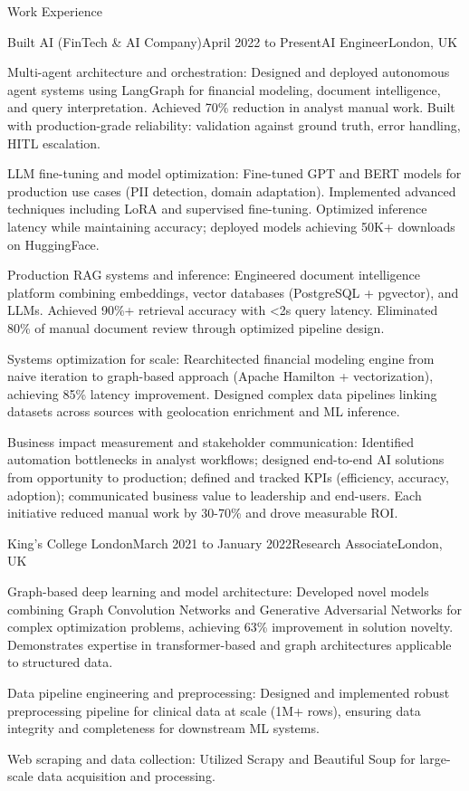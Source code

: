 \documentclass{resume} %
\begin{document}
\begin{rSection}{Work Experience}
\begin{rSubsection}{Built AI (FinTech \& AI Company)}{April 2022 to Present}{AI Engineer}{London, UK}
\item Multi-agent architecture and orchestration: Designed and deployed autonomous agent systems using LangGraph for financial modeling, document intelligence, and query interpretation. Achieved 70\% reduction in analyst manual work. Built with production-grade reliability: validation against ground truth, error handling, HITL escalation.
\item LLM fine-tuning and model optimization: Fine-tuned GPT and BERT models for production use cases (PII detection, domain adaptation). Implemented advanced techniques including LoRA and supervised fine-tuning. Optimized inference latency while maintaining accuracy; deployed models achieving 50K+ downloads on HuggingFace.
\item Production RAG systems and inference: Engineered document intelligence platform combining embeddings, vector databases (PostgreSQL + pgvector), and LLMs. Achieved 90\%+ retrieval accuracy with <2s query latency. Eliminated 80\% of manual document review through optimized pipeline design.
\item Systems optimization for scale: Rearchitected financial modeling engine from naive iteration to graph-based approach (Apache Hamilton + vectorization), achieving 85\% latency improvement. Designed complex data pipelines linking datasets across sources with geolocation enrichment and ML inference.
\item Business impact measurement and stakeholder communication: Identified automation bottlenecks in analyst workflows; designed end-to-end AI solutions from opportunity to production; defined and tracked KPIs (efficiency, accuracy, adoption); communicated business value to leadership and end-users. Each initiative reduced manual work by 30-70\% and drove measurable ROI.
\end{rSubsection}


\begin{rSubsection}{King's College London}{March 2021 to January 2022}{Research Associate}{London, UK}
\item Graph-based deep learning and model architecture: Developed novel models combining Graph Convolution Networks and Generative Adversarial Networks for complex optimization problems, achieving 63\% improvement in solution novelty. Demonstrates expertise in transformer-based and graph architectures applicable to structured data.
\item Data pipeline engineering and preprocessing: Designed and implemented robust preprocessing pipeline for clinical data at scale (1M+ rows), ensuring data integrity and completeness for downstream ML systems.
\item Web scraping and data collection: Utilized Scrapy and Beautiful Soup for large-scale data acquisition and processing.

\end{rSubsection}

\end{rSection}
\end{document}
